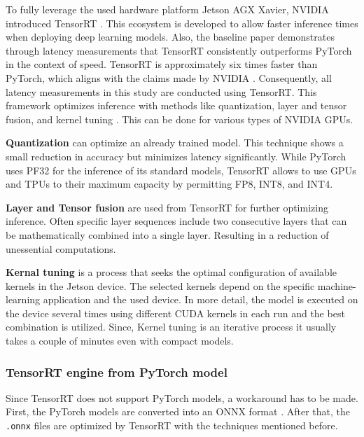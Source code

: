 To fully leverage the used hardware platform Jetson AGX Xavier, NVIDIA introduced TensorRT \cite{nvidia_tensorrt}.
This ecosystem is developed to allow faster inference times when deploying deep learning models.
Also, the baseline paper \cite{tepNet2024} demonstrates through latency measurements that TensorRT consistently outperforms PyTorch in the context of speed.
TensorRT is approximately six times faster than PyTorch, which aligns with the claims made by NVIDIA \cite{tepNet2024} \cite{nvidia_tensorrt}.
Consequently, all latency measurements in this study are conducted using TensorRT.
This framework optimizes inference with methods like quantization, layer and tensor fusion, and kernel tuning \cite{nvidia_tensorrt}.
This can be done for various types of NVIDIA \ac{GPU}s.

\vspace{0.8cm}

\noindent\textbf{Quantization} can optimize an already trained model.
This technique shows a small reduction in accuracy but minimizes latency significantly.
While PyTorch uses PF32 for the inference of its standard models, TensorRT allows to use \ac{GPU}s and \ac{TPU}s to their maximum capacity by permitting FP8, INT8, and INT4.

\vspace{0.8cm}

\noindent\textbf{Layer and Tensor fusion} are used from TensorRT for further optimizing inference.
Often specific layer sequences include two consecutive layers that can be mathematically combined into a single layer.
Resulting in a reduction of unessential computations.

\vspace{0.8cm}

\noindent\textbf{Kernal tuning} is a process that seeks the optimal configuration of available kernels in the Jetson device.
The selected kernels depend on the specific machine-learning application and the used device.
In more detail, the model is executed on the device several times using different CUDA kernels in each run and the best combination is utilized.
Since, Kernel tuning is an iterative process it usually takes a couple of minutes even with compact models.

\subsubsection{TensorRT engine from PyTorch model}

Since TensorRT does not support PyTorch models, a workaround has to be made.
First, the PyTorch models are converted into an \ac{ONNX} format \cite{onnx_docu}.
After that, the \texttt{.onnx} files are optimized by TensorRT with the techniques mentioned before.


